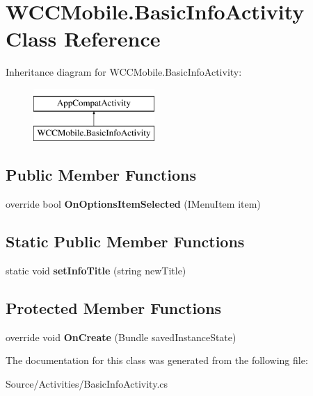 \hypertarget{class_w_c_c_mobile_1_1_basic_info_activity}{}\section{W\+C\+C\+Mobile.\+Basic\+Info\+Activity Class Reference}
\label{class_w_c_c_mobile_1_1_basic_info_activity}
Inheritance diagram for W\+C\+C\+Mobile.\+Basic\+Info\+Activity\+:\begin{figure}[H]
\begin{center}
\leavevmode
\includegraphics[height=2.000000cm]{class_w_c_c_mobile_1_1_basic_info_activity}
\end{center}
\end{figure}
\subsection*{Public Member Functions}
\begin{DoxyCompactItemize}
\item 
override bool {\bfseries On\+Options\+Item\+Selected} (I\+Menu\+Item item)\hypertarget{class_w_c_c_mobile_1_1_basic_info_activity_a5fd28198ec622865064002f9f343e1e5}{}\label{class_w_c_c_mobile_1_1_basic_info_activity_a5fd28198ec622865064002f9f343e1e5}

\end{DoxyCompactItemize}
\subsection*{Static Public Member Functions}
\begin{DoxyCompactItemize}
\item 
static void {\bfseries set\+Info\+Title} (string new\+Title)\hypertarget{class_w_c_c_mobile_1_1_basic_info_activity_aef49547da4fca04a6556220c3b5c2808}{}\label{class_w_c_c_mobile_1_1_basic_info_activity_aef49547da4fca04a6556220c3b5c2808}

\end{DoxyCompactItemize}
\subsection*{Protected Member Functions}
\begin{DoxyCompactItemize}
\item 
override void {\bfseries On\+Create} (Bundle saved\+Instance\+State)\hypertarget{class_w_c_c_mobile_1_1_basic_info_activity_aedceea6ca307d1d3d37d0c06460621e8}{}\label{class_w_c_c_mobile_1_1_basic_info_activity_aedceea6ca307d1d3d37d0c06460621e8}

\end{DoxyCompactItemize}


The documentation for this class was generated from the following file\+:\begin{DoxyCompactItemize}
\item 
Source/\+Activities/Basic\+Info\+Activity.\+cs\end{DoxyCompactItemize}
